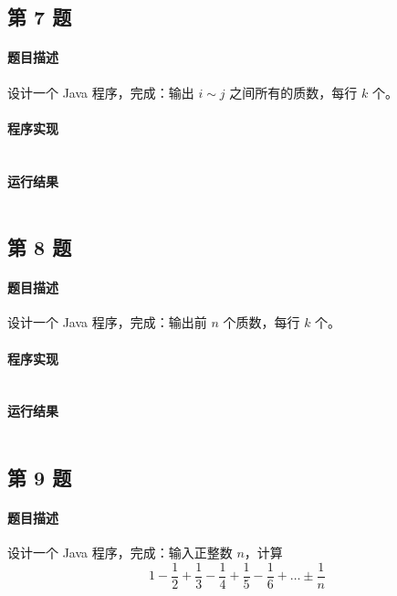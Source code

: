 \documentclass{academics}
\begin{document}
\subsection{第 7 题}

\paragraph{题目描述} {
    设计一个 Java 程序，完成：输出 $i\sim j$ 之间所有的质数，每行 $k$ 个。
}

\paragraph{程序实现} {
    \inputminted[label=Solution.java]{java}{../src/P07/Solution.java}
}

\paragraph{运行结果} {
    \inputminted{text}{../res/P07.out}
}

\subsection{第 8 题}

\paragraph{题目描述} {
    设计一个 Java 程序，完成：输出前 $n$ 个质数，每行 $k$ 个。
}

\paragraph{程序实现} {
    \inputminted[label=Solution.java]{java}{../src/P08/Solution.java}
}

\paragraph{运行结果} {
    \inputminted{text}{../res/P08.out}
}

\subsection{第 9 题}

\paragraph{题目描述} {
    设计一个 Java 程序，完成：输入正整数 $n$，计算 $$1-\frac{1}{2}+\frac{1}{3}-\frac{1}{4}+\frac{1}{5}-\frac{1}{6}+\dots\pm\frac{1}{n}$$
}
\end{document}
